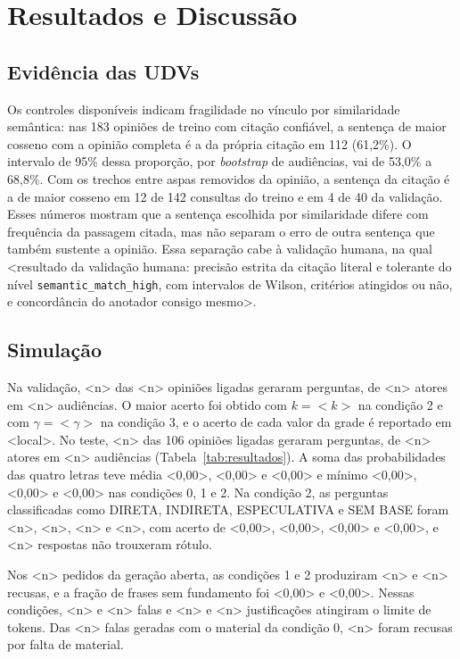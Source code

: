 \section{Resultados e Discuss\~ao}
\label{sec:resultados}

\subsection{Evidência das UDVs}
\label{sec:resultados-udv}

Os controles disponíveis indicam fragilidade no vínculo por similaridade semântica: nas 183 opiniões
de treino com citação confiável, a sentença de maior cosseno com a opinião completa é a da própria
citação em 112 (61,2\%). O intervalo de 95\% dessa proporção, por \textit{bootstrap} de audiências,
vai de 53,0\% a 68,8\%. Com os trechos entre aspas removidos da opinião, a sentença da citação é a
de maior cosseno em 12 de 142 consultas do treino e em 4 de 40 da validação. Esses números mostram
que a sentença escolhida por similaridade difere com frequência da passagem citada, mas não separam
o erro de outra sentença que também sustente a opinião. Essa separação cabe à validação humana, na
qual <resultado da validação humana: precisão estrita da citação literal e tolerante do nível
\texttt{semantic\_match\_high}, com intervalos de Wilson, critérios atingidos ou não, e concordância
do anotador consigo mesmo>.

\subsection{Simulação}
\label{sec:resultados-simulacao}



Na validação, <n> das <n> opiniões ligadas geraram perguntas, de <n> atores em <n> audiências. O
maior acerto foi obtido com $k = {<}k{>}$ na condição 2 e com $\gamma = {<}\gamma{>}$ na condição 3,
e o acerto de cada valor da grade é reportado em <local>. No teste, <n> das 106 opiniões ligadas
geraram perguntas, de <n> atores em <n> audiências (Tabela~\ref{tab:resultados}). A soma das
probabilidades das quatro letras teve média <0,00>, <0,00> e <0,00> e mínimo <0,00>, <0,00> e
<0,00> nas condições 0, 1 e 2. Na condição 2, as perguntas classificadas como DIRETA, INDIRETA,
ESPECULATIVA e SEM BASE foram <n>, <n>, <n> e <n>, com acerto de <0,00>, <0,00>, <0,00> e <0,00>, e
<n> respostas não trouxeram rótulo.

Nos <n> pedidos da geração aberta, as condições 1 e 2 produziram <n> e <n> recusas, e a fração de
frases sem fundamento foi <0,00> e <0,00>. Nessas condições, <n> e <n> falas e <n> e <n>
justificações atingiram o limite de tokens. Das <n> falas geradas com o material da condição 0, <n>
foram recusas por falta de material.

